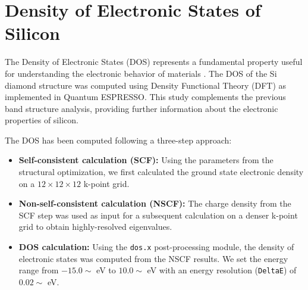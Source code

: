 \documentclass{article}
\begin{document}




\section{Density of Electronic States of Silicon}

The Density of Electronic States (DOS) represents a fundamental property useful for understanding the electronic behavior of materials \cite{ashcroft_mermin_1976}. The DOS of the Si diamond structure was computed using Density Functional Theory (DFT) as implemented in Quantum ESPRESSO. This study complements the previous band structure analysis, providing further information about the electronic properties of silicon.

The DOS has been computed following a three-step approach:
\begin{itemize}
    \item \textbf{Self-consistent calculation (SCF):} Using the parameters from the structural optimization, we first calculated the ground state electronic density on a $12\times12\times12$ k-point grid.
    \item \textbf{Non-self-consistent calculation (NSCF):} The charge density from the SCF step was used as input for a subsequent calculation on a denser k-point grid to obtain highly-resolved eigenvalues.
    \item \textbf{DOS calculation:} Using the \verb|dos.x| post-processing module, the density of electronic states was computed from the NSCF results. We set the energy range from $-15.0\sim$ eV to $10.0\sim$ eV with an energy resolution (\verb|DeltaE|) of $0.02\sim$ eV.
\end{itemize}
\end{document}
